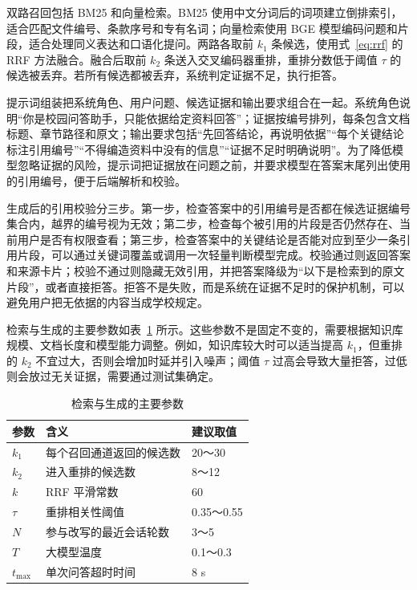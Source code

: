 双路召回包括 BM25 和向量检索。BM25 使用中文分词后的词项建立倒排索引，适合匹配文件编号、条款序号和专有名词；向量检索使用 BGE 模型编码问题和片段，适合处理同义表达和口语化提问。两路各取前 $k_1$ 条候选，使用式~\eqref{eq:rrf} 的 RRF 方法融合。融合后取前 $k_2$ 条送入交叉编码器重排，重排分数低于阈值 $\tau$ 的候选被丢弃。若所有候选都被丢弃，系统判定证据不足，执行拒答。

提示词组装把系统角色、用户问题、候选证据和输出要求组合在一起。系统角色说明“你是校园问答助手，只能依据给定资料回答”；证据按编号排列，每条包含文档标题、章节路径和原文；输出要求包括“先回答结论，再说明依据”“每个关键结论标注引用编号”“不得编造资料中没有的信息”“证据不足时明确说明”。为了降低模型忽略证据的风险，提示词把证据放在问题之前，并要求模型在答案末尾列出使用的引用编号，便于后端解析和校验。

生成后的引用校验分三步。第一步，检查答案中的引用编号是否都在候选证据编号集合内，越界的编号视为无效；第二步，检查每个被引用的片段是否仍然存在、当前用户是否有权限查看；第三步，检查答案中的关键结论是否能对应到至少一条引用片段，可以通过关键词覆盖或调用一次轻量判断模型完成。校验通过则返回答案和来源卡片；校验不通过则隐藏无效引用，并把答案降级为“以下是检索到的原文片段”，或者直接拒答。拒答不是失败，而是系统在证据不足时的保护机制，可以避免用户把无依据的内容当成学校规定。

检索与生成的主要参数如表~\ref{tab:params} 所示。这些参数不是固定不变的，需要根据知识库规模、文档长度和模型能力调整。例如，知识库较大时可以适当提高 $k_1$，但重排的 $k_2$ 不宜过大，否则会增加时延并引入噪声；阈值 $\tau$ 过高会导致大量拒答，过低则会放过无关证据，需要通过测试集确定。

\begin{table}[H]
  \centering
  \caption{检索与生成的主要参数}
  \label{tab:params}
  \renewcommand{\arraystretch}{1.25}
  \begin{tabular}{p{2.6cm}p{6.2cm}p{3.2cm}}
    \toprule
    参数 & 含义 & 建议取值 \\
    \midrule
    $k_1$ & 每个召回通道返回的候选数 & 20～30 \\
    $k_2$ & 进入重排的候选数 & 8～12 \\
    $k$ & RRF 平滑常数 & 60 \\
    $\tau$ & 重排相关性阈值 & 0.35～0.55 \\
    $N$ & 参与改写的最近会话轮数 & 3～5 \\
    $T$ & 大模型温度 & 0.1～0.3 \\
    $t_{\max}$ & 单次问答超时时间 & 8 s \\
    \bottomrule
  \end{tabular}
\end{table}

